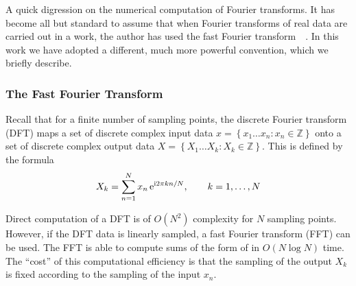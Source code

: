 A quick digression on the numerical computation of Fourier transforms.  It
has become all but standard to assume that when Fourier transforms of real
data are carried out in a work, the author has used the fast Fourier
transform~\cite{frigo1998fftw}~\cite{cooley1965algorithm}.  In this work we
have adopted a different, much more powerful convention, which we briefly
describe.

\subsubsection{The Fast Fourier Transform}
Recall that for a finite number of sampling points, the discrete
Fourier transform (DFT) maps a set of discrete complex input data
$x = \left\{x_1\dots x_n : x_n\in\mathbb{Z}\right\}$ onto a set of
discrete complex output data $X =
\left\{X_1\dots X_k : X_k\in\mathbb{Z}\right\}$.  This is defined by the
formula
\begin{equation}
X_k = \sum_{n=1}^{N} x_n\, {\mathrm{e}}^{{\mathrm{i}} 2\pi k n/N}, \qquad k=1,\ldots,N
\label{eqn:dft}
\end{equation}

Direct computation of a DFT is of $O(N^2)$ complexity for $N$ sampling
points.  However, if the DFT data is linearly sampled, a fast Fourier
transform (FFT) can be used. The FFT is able to compute sums of the form of
 in $O(N \log N)$ time.  The ``cost'' of this
computational efficiency is that the sampling of the output $X_k$ is fixed
according to the sampling of the input $x_n$.

